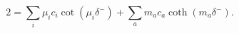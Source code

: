 \begin{equation} 
\label{delta+-}
2 =
\sum_i \mu_i c_i \cot(\mu_i  \delta^-) + 
\sum_a m_a c_a \coth(m_a  \delta^-).
\end{equation}

